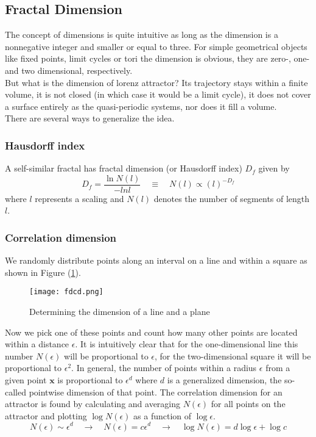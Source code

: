 \subsection{Fractal Dimension}{\label{sec:fd}}
The concept of dimensions is quite intuitive as long as the dimension is a nonnegative integer and smaller or equal to three.
For simple geometrical objects like fixed points, limit cycles or tori the dimension is obvious, they are zero-, one- and two dimensional, respectively.\\
But what is the dimension of lorenz attractor? Its trajectory stays within a finite volume, it is not closed (in which case it would be a limit cycle), it does not cover a surface entirely as the quasi-periodic systems, nor does it fill a volume.\\
There are several ways to generalize the idea.
\subsubsection{Hausdorff index}
A self-similar fractal has fractal dimension (or Hausdorff index) $D_f$ given by
\begin{equation}
	D_f=\frac{\ln N(l)}{-ln l}\quad\equiv\quad N(l)\propto(l)^{-D_f}
\end{equation}
where $l$ represents a scaling and $N(l)$ denotes the number of segments of length $l$. 
\subsubsection{Correlation dimension}
We randomly distribute points along an interval on a line and within a square as shown in Figure (\ref{fig:fdcd}).
\begin{figure}[h!]
	\centering
	\texttt{[image: fdcd.png]}
	\caption{Determining the dimension of a line and a plane}
	\label{fig:fdcd}
\end{figure}
Now we pick one of these points and count how many other points are located within a distance $\epsilon$.
It is intuitively clear that for the one-dimensional line this number $N(\epsilon)$ will be proportional to $\epsilon$, for the two-dimensional square it will be proportional to $\epsilon^2$.
In general, the number of points within a radius $\epsilon$ from a given point $\mathbf{x}$ is proportional to $\epsilon^d$ where $d$ is a generalized dimension, the so-called pointwise dimension of that point.
The correlation dimension for an attractor is found by calculating and averaging $N(\epsilon)$ for all points on the attractor and plotting $\log N(\epsilon)$ as a function of $\log\epsilon$.
\begin{equation}
	N(\epsilon)\sim\epsilon^d\quad\rightarrow\quad N(\epsilon)=c\epsilon^d\quad\rightarrow\quad\log N(\epsilon)=d\log\epsilon+\log c
\end{equation}
